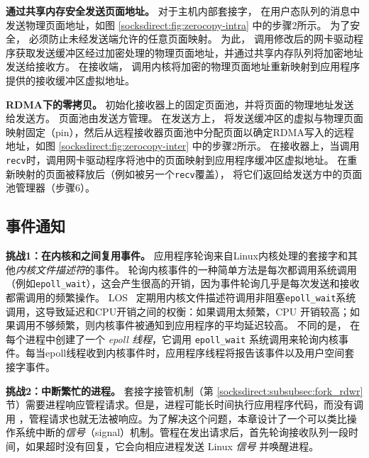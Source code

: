 \textbf {通过共享内存安全发送页面地址。}
对于主机内部套接字，\libipc{} 在用户态队列的消息中发送物理页面地址，如图 \ref {socksdirect:fig:zerocopy-intra} 中的步骤2所示。
为了安全，\sys{} 必须防止未经发送端允许的任意页面映射。
为此，\libipc {} 调用修改后的网卡驱动程序获取发送缓冲区经过加密处理的物理页面地址，并通过共享内存队列将加密地址发送给接收方。
在接收端，\libipc {} 调用内核将加密的物理页面地址重新映射到应用程序提供的接收缓冲区虚拟地址。

\textbf {RDMA下的零拷贝。}
\libipc {} 初始化接收器上的固定页面池，并将页面的物理地址发送给发送方。
页面池由发送方管理。
在发送方上，\libipc {} 将发送缓冲区的虚拟与物理页面映射固定（pin），然后从远程接收器页面池中分配页面以确定RDMA写入的远程地址，如图 \ref {socksdirect:fig:zerocopy-inter} 中的步骤2所示。
在接收器上，当调用\texttt {recv}时，\libipc 调用网卡驱动程序将池中的页面映射到应用程序缓冲区虚拟地址。
在重新映射的页面被释放后（例如被另一个\texttt {recv}覆盖），\libipc {} 将它们返回给发送方中的页面池管理器（步骤6）。



\subsection{事件通知}
\label{socksdirect:subsec:process-mux}

\textbf {挑战1：在内核和\libipc {}之间复用事件。}
应用程序轮询来自Linux内核处理的套接字和其他\textit {内核文件描述符}的事件。
轮询内核事件的一种简单方法是每次都调用系统调用（例如\texttt {epoll\_wait}），这会产生很高的开销，因为事件轮询几乎是每次发送和接收都需调用的频繁操作。
LOS~ \cite {huang2017high} 定期用内核文件描述符调用非阻塞\texttt {epoll\_wait}系统调用，这导致延迟和CPU开销之间的权衡：如果调用太频繁，CPU 开销较高；如果调用不够频繁，则内核事件被通知到应用程序的平均延迟较高。
不同的是，\libipc {} 在每个进程中创建了一个 \textit {epoll 线程}，它调用 \texttt {epoll\_wait} 系统调用来轮询内核事件。每当epoll线程收到内核事件时，应用程序线程将报告该事件以及用户空间套接字事件。

\textbf {挑战2：中断繁忙的进程。}
套接字接管机制（第 \ref {socksdirect:subsubsec:fork_rdwr} 节）需要进程响应管程请求。但是，进程可能长时间执行应用程序代码，而没有调用 \libipc {}，管程请求也就无法被响应。为了解决这个问题，本章设计了一个可以类比操作系统中断的\textit {信号}（signal）机制。管程在发出请求后，首先轮询接收队列一段时间，如果超时没有回复，它会向相应进程发送 Linux \textit {信号} 并唤醒进程。


